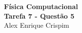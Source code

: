 


  \begin{center}
    \LARGE \textbf{Física Computacional} \\
    \Large \textbf{Tarefa 7 - Questão 5} \\
    \large Alex Enrique Crispim
  \end{center}

  



